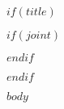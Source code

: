 \documentclass[table$if(handout)$,handout$endif$]{beamer}
\title$if(short-title)$[$short-title$]$endif${$title$}
\author{$for(author)$$author$$sep$ \and $endfor$}
\institute{$institute$}
\date{$date$}
\begin{document}
$if(title)$
\begin{frame}
  \titlepage
  $if(joint)$
  \begin{center}
  \end{center}
  $endif$
\end{frame}
$endif$

$body$
\end{document}
